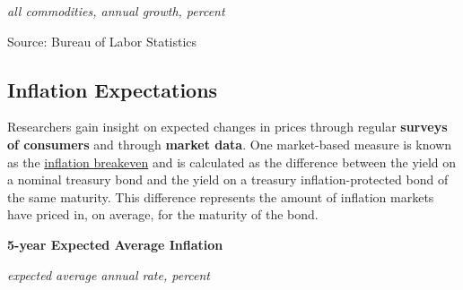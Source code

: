 \documentclass{report}
\makeatletter
\newcommand{\tbllink}[1]{\href{https://raw.githubusercontent.com/bdecon/US-chartbook/master/chartbook/data/#1}{\faTable}}
\newcommand*\short[1]{\expandafter\@gobbletwo\number\numexpr#1\relax}
\newcommand{\stdnode}[3]{\node[below, align=left, shift=({#1,#2})]{#3};}
\newcommand{\dateaxisticks}{
		date coordinates in=x, axis line style={draw=none},
		xmax={2020-10-01},
		max space between ticks=40,	    
		xtick={{1990-01-01}, {1992-01-01}, {1994-01-01}, 
			{1996-01-01}, {1998-01-01}, {2000-01-01}, 
			{2002-01-01}, {2004-01-01}, {2006-01-01},
			{2008-01-01}, {2010-01-01}, {2012-01-01}, {2014-01-01},
		    {2016-01-01}, {2018-01-01}, {2020-01-01}},
		minor xtick={{1989-01-01}, {1991-01-01}, {1993-01-01},
			{1995-01-01}, {1997-01-01}, {1999-01-01}, 
			{2001-01-01}, {2003-01-01}, {2005-01-01}, {2007-01-01},
		    {2009-01-01}, {2011-01-01}, {2013-01-01}, {2015-01-01},
		    {2017-01-01}, {2019-01-01}},
		enlarge y limits={0.06}, enlarge x limits={0.01},
		}
\newcommand{\ltdateaxisticks}{
		date coordinates in=x, axis line style={draw=none},
		xmax={2020-09-30},
		max space between ticks=40,	    
		xtick={{2015-01-01}, {2016-01-01}, {2017-01-01}, {2018-01-01}, 
		    {2019-01-01}, {2020-01-01}},
		enlarge y limits={0.06}, enlarge x limits={0.01},
		}
\newcommand{\bbar}[2]{extra #1 ticks = {{#2}}, extra #1 tick labels = ,
		extra #1 tick style = {grid=major, grid style={thick, black!25}},}
\newcommand{\stdline}[4]{\addplot[very thick, no markers, color=#1] 
		table [x=#2, y=#3, col sep=comma] {#4};	}
\newcommand{\thinline}[4]{\addplot[no markers, color=#1] 
		table [x=#2, y=#3, col sep=comma] {#4};	}
\newcommand{\rbars}{
		\fill[color=black!10] (axis cs:{1990-07-01},\pgfkeysvalueof{/pgfplots/ymin}) rectangle 
			(axis cs:{1991-03-01}, \pgfkeysvalueof{/pgfplots/ymax});
		\fill[color=black!10] (axis cs:{2007-12-01},\pgfkeysvalueof{/pgfplots/ymin}) rectangle 
			(axis cs:{2009-07-01}, \pgfkeysvalueof{/pgfplots/ymax});
		\fill[color=black!10] (axis cs:{2001-03-01},\pgfkeysvalueof{/pgfplots/ymin}) rectangle 
			(axis cs:{2001-11-01}, \pgfkeysvalueof{/pgfplots/ymax});
		\fill[color=black!10] (axis cs:{2020-02-01},\pgfkeysvalueof{/pgfplots/ymin}) rectangle 
			(axis cs:{2020-10-01}, \pgfkeysvalueof{/pgfplots/ymax});}
\makeatother
\begin{document}
{{{{{{{{{\begin{minipage}{0.47\textwidth}
\footnotesize{\textit{all commodities, annual growth, percent}}

\hspace*{-2mm} 

\footnotesize{Source: Bureau of Labor Statistics} \hfill \tbllink{ppi.csv}
\end{minipage} \hspace{6mm} 
\begin{minipage}{0.24\textwidth}
\small 
\end{minipage}
\subsection*{\color{black!70} \seriffont Inflation Expectations}
\begin{minipage}{0.76\textwidth}
\small Researchers gain insight on expected changes in prices through regular \textbf{surveys of consumers} and through \textbf{market data}. One market-based measure is known as the \href{https://fred.stlouisfed.org/series/T5YIE}{inflation breakeven} and is calculated as the difference between the yield on a nominal treasury bond and the yield on a treasury inflation-protected bond of the same maturity. This difference represents the amount of inflation markets have priced in, on average, for the maturity of the bond.
\end{minipage}

\begin{minipage}{0.36\textwidth}
\normalsize \textbf{5-year Expected Average Inflation}

\footnotesize{\textit{expected average annual rate, percent}}

\hspace*{-2mm} 


\end{minipage}}}}}}}}}}
\end{document}

